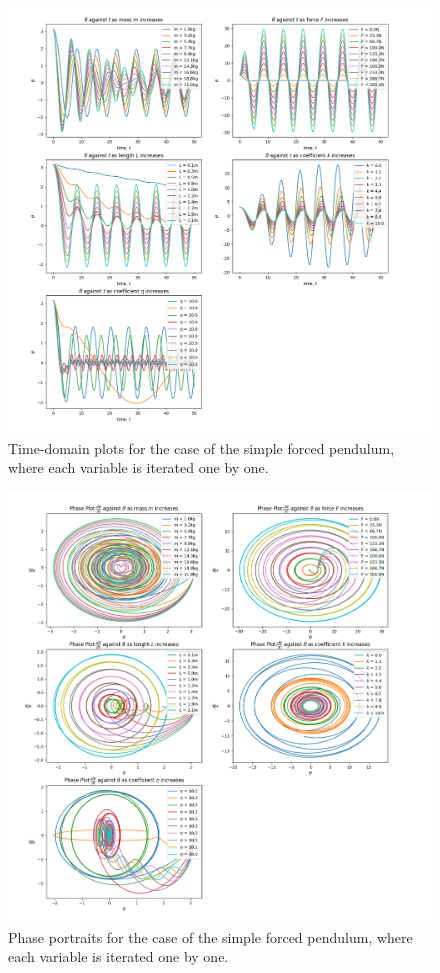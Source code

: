\documentclass[10pt, twocolumn]{article}
\begin{document}
\onecolumn
\begin{figure}[H]
    \centering
    \includegraphics[width = 1.1\columnwidth]{Projects/ForcedSimplePendulum/Plots/test_plots.png}
    \caption{Time-domain plots for the case of the simple forced pendulum, where each variable is iterated one by one.}
    \label{time domain test}
\end{figure}

\begin{figure}[H]
    \centering
    \includegraphics{Projects/ForcedSimplePendulum/Plots/test_plots_phase.png}
    \caption{Phase portraits for the case of the simple forced pendulum, where each variable is iterated one by one.}
    \label{phase portrait}
\end{figure}
\end{document}
